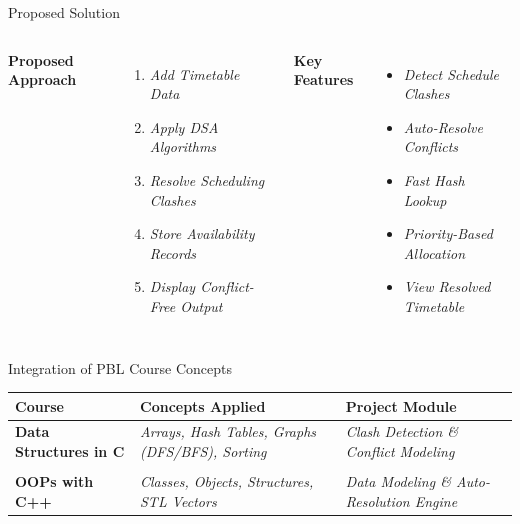 \documentclass[aspectratio=169,11pt]{beamer}
\newcommand{\smallnote}[1]{\vspace{0.08cm}{\scriptsize\color{GEUGrey}#1}}
\newcommand{\placeholder}[1]{\textit{\color{GEUGrey}#1}}
\begin{document}
\begin{frame}{Proposed Solution}
\begin{columns}[T,totalwidth=\textwidth]
\textbf{\color{GEUBlue}Proposed Approach}
\begin{enumerate}\itemsep3pt
\item \placeholder{Add Timetable Data}
\item \placeholder{Apply DSA Algorithms}
\item \placeholder{Resolve Scheduling Clashes}
\item \placeholder{Store Availability Records}
\item \placeholder{Display Conflict-Free Output}
\end{enumerate}
\textbf{\color{GEUBlue}Key Features}
\begin{itemize}\itemsep3pt
\item \placeholder{Detect Schedule Clashes}
\item \placeholder{Auto-Resolve Conflicts}
\item \placeholder{\textit{Fast Hash Lookup}}
\item \placeholder{Priority-Based Allocation}
\item \placeholder{View Resolved Timetable}
\end{itemize}
\end{columns}
\vfill
\smallnote{}
\end{frame}

\begin{frame}{Integration of PBL Course Concepts}
\scriptsize
\begin{center}
\renewcommand{\arraystretch}{1.25}
\begin{tabularx}{.96\textwidth}{@{}>{\bfseries}p{3.0cm}X p{2.5cm}@{}}
\toprule
Course & Concepts Applied & Project Module\\
\midrule
Data Structures in C & \placeholder{Arrays, Hash Tables, Graphs (DFS/BFS), Sorting} & \placeholder{Clash Detection \& Conflict Modeling}\\\\
\midrule
OOPs with C++ & \placeholder{Classes, Objects, Structures, STL Vectors} & \placeholder{Data Modeling \& Auto-Resolution Engine}\\

\bottomrule
\end{tabularx}
\end{center}
\vfill
\begin{center}
\end{center}
\end{frame}
\end{document}
